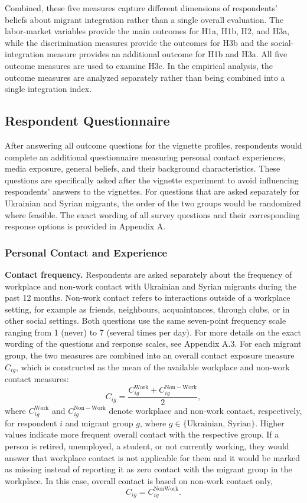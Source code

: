 Combined, these five measures capture different dimensions of respondents' beliefs about migrant integration rather 
than a single overall evaluation. The labor-market variables provide the main outcomes for H1a, H1b, H2, and H3a, 
while the discrimination measures provide the outcomes for H3b and the social-integration measure provides an additional 
outcome for H1b and H3a. All five outcome measures are used to examine H3c. In the empirical 
analysis, the outcome measures are analyzed separately rather than being combined into a single integration index.

\subsection{Respondent Questionnaire}

After answering all outcome questions for the vignette profiles, respondents would complete an additional questionnaire 
measuring personal contact experiences, media exposure, general beliefs, and their background characteristics. 
These questions are specifically asked after the vignette experiment to avoid influencing respondents' answers 
to the vignettes. For questions that are asked separately for Ukrainian and Syrian migrants, the order of the two 
groups would be randomized where feasible. The exact wording of all survey questions and their corresponding response 
options is provided in Appendix A.

\subsubsection{Personal Contact and Experience}

\noindent\textbf{Contact frequency.} Respondents are asked separately about the frequency of workplace and non-work 
contact with Ukrainian and Syrian migrants during the past 12 months. Non-work contact refers to interactions outside 
of a workplace setting, for example as friends, neighbours, acquaintances, through clubs, or in other social settings. 
Both questions use the same seven-point frequency scale ranging from 1 (never) to 7 (several times per day).
For more details on the exact wording of the questions and response scales, see Appendix A.3.
For each migrant group, the two measures are combined into an overall contact exposure measure \(C_{ig}\), which is 
constructed as the mean of the available workplace and non-work contact measures:
$$ C_{ig}=\frac{C^{\mathrm{Work}}_{ig}+C^{\mathrm{Non-Work}}_{ig}}{2}, $$
where \(C^{\mathrm{Work}}_{ig}\) and \(C^{\mathrm{Non-Work}}_{ig}\) denote workplace and non-work contact, respectively, for 
respondent \(i\) and migrant group \(g\), where \(g \in \{\text{Ukrainian, Syrian}\}\). Higher values indicate 
more frequent overall contact with the respective group. If a person is retired, unemployed, a student, or not currently 
working, they would answer that workplace contact is not applicable for them and it would be marked as missing instead 
of reporting it as zero contact with the migrant group in the workplace. In this case, overall contact is based on 
non-work contact only, $$ C_{ig}=C_{ig}^{\mathrm{NonWork}}. $$

